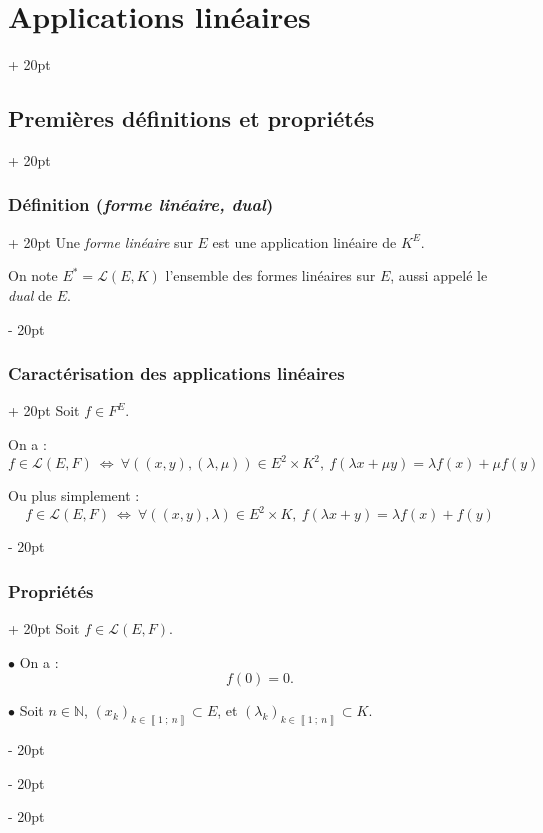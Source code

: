 \documentclass[a4paper, 12pt, twoside]{article}
\newcommand{\N}{\mathbb{N}} %
\newcommand{\nset}[2]{\left\llbracket #1\ ;\ #2 \right\rrbracket}
\newcommand{\ssi}{\ \Leftrightarrow \ }
\newcommand{\ind}[1][20pt]{\advance\leftskip + #1}
\newcommand{\deind}[1][20pt]{\advance\leftskip - #1}
\newenvironment{indt}[2][20pt]{#2 \par \ind[#1]}{\par \deind} %
\begin{document}
\begin{indt}{\section{Applications linéaires}}
\begin{indt}{\subsection{Premières définitions et propriétés}}
            \vspace{12pt}
            
            \begin{indt}{\subsubsection{Définition (\textit{forme linéaire, dual})}}
                Une \textit{forme linéaire} sur $E$ est une application linéaire de $K^E$.

                On note $E^* = \mathcal L(E, K)$ l'ensemble des formes linéaires sur $E$, aussi appelé le \textit{dual} de $E$.
            \end{indt}

            \vspace{12pt}
            
            \begin{indt}{\subsubsection{Caractérisation des applications linéaires}}
                Soit $f \in F^E$.

                On a :
                \[
                    f \in \mathcal L(E, F)
                    \ssi
                    \forall ((x, y), (\lambda, \mu)) \in E^2 \times K^2,\
                    f(\lambda x + \mu y) = \lambda f(x) + \mu f(y)
                \]

                Ou plus simplement :
                \[
                    f \in \mathcal L(E, F)
                    \ssi
                    \forall ((x, y), \lambda) \in E^2 \times K,\
                    f(\lambda x + y) = \lambda f(x) + f(y)
                \]
            \end{indt}

            \vspace{12pt}
            
            \begin{indt}{\subsubsection{Propriétés}}
                Soit $f \in \mathcal L(E, F)$.

                $\bullet$ On a :
                \[
                    f(0) = 0.
                \]

                $\bullet$ Soit $n \in \N$, $(x_k)_{k \in \nset 1 n} \subset E$, et $(\lambda_k)_{k \in \nset 1 n} \subset K$.


\end{indt}
\end{indt}
\end{indt}
\end{document}
